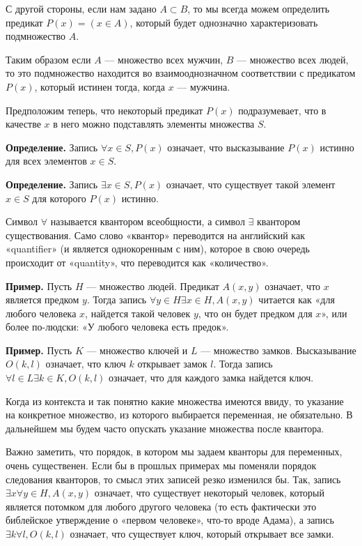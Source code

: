 С другой стороны, если нам задано $A \subset B$, то мы всегда можем определить предикат $P(x) = (x\in A)$, который будет однозначно характеризовать подмножество $A$.

Таким образом если $A$ — множество всех мужчин, $B$ — множество всех людей, то это подмножество находится во взаимооднозначном соответствии с предикатом $P(x)$, который истинен тогда, когда $x$ — мужчина.

Предположим теперь, что некоторый предикат $P(x)$ подразумевает, что в качестве $x$ в него можно подставлять элементы множества $S$.

{\bfseries Определение.} Запись $\forall x\in S, P(x)$ означает, что высказывание $P(x)$ истинно для всех элементов $x \in S$.

{\bfseries Определение.} Запись $\exists x\in S, P(x)$ означает, что существует такой элемент $x\in S$ для которого $P(x)$ истинно.

Символ $\forall$ называется квантором всеобщности, а символ $\exists$ квантором существования.  Само слово «квантор» переводится на английский как «quantifier» (и является однокоренным с ним), которое в свою очередь происходит от «quantity», что переводится как «количество».

{\bfseries Пример.} Пусть $H$ — множество людей. Предикат $A(x, y)$ означает, что $x$ является предком $y$. Тогда запись $\forall y\in H \exists x \in H, A(x, y)$ читается как «для любого человека $x$, найдется такой человек $y$, что он будет предком для $x$», или более по-людски: «У любого человека есть предок».

{\bfseries Пример.} Пусть $K$ — множество ключей и $L$ — множество замков. Высказывание $O(k, l)$ означает, что ключ $k$ открывает замок $l$. Тогда запись $\forall l\in L \exists k \in K, O(k, l)$ означает, что для каждого замка найдется ключ.

Когда из контекста и так понятно какие множества имеются ввиду, то указание на конкретное множество, из которого выбирается переменная, не обязательно. В дальнейшем мы будем часто опускать указание множества после квантора.

Важно заметить, что порядок, в котором мы задаем кванторы для переменных, очень существенен. Если бы в прошлых примерах мы поменяли порядок следования кванторов, то смысл этих записей резко изменился бы. Так, запись $\exists x \forall y \in H, A(x, y)$ означает, что существует некоторый человек, который является потомком для любого другого человека (то есть фактически это библейское утверждение о «первом человеке», что-то вроде Адама), а запись $\exists k \forall l, O(k, l)$ означает, что существует ключ, который открывает все замки.

